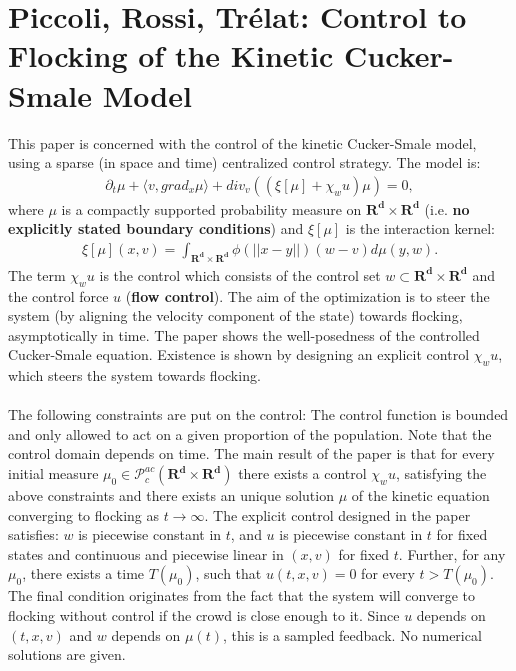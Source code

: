 \documentclass[11pt, a4paper]{article}
\theoremstyle{definition}
\begin{document}
\section{Piccoli, Rossi, Tr\'elat: Control to Flocking of the Kinetic Cucker-Smale Model \cite{piccoli2014no1}}
This paper is concerned with the control of the kinetic Cucker-Smale model, using a sparse (in space and time) centralized control strategy. The model is:
\begin{align*}
\partial_t \mu + \langle v, grad_x \mu\rangle + div_v ((\xi[\mu]+ \chi_w u)\mu)=0,
\end{align*}
where $\mu$ is a compactly supported probability measure on $\mathbf{R^d} \times \mathbf{R^d}$ (i.e. \textbf{no explicitly stated boundary conditions}) and $\xi[\mu]$ is the interaction kernel:
\begin{align*}
\xi[\mu](x,v)= \int_{\mathbf{R^d} \times \mathbf{R^d}} \phi(||x-y||)(w-v) d \mu (y,w).
\end{align*}
The term $\chi_w u$ is the control which consists of the control set $w \subset \mathbf{R^d} \times \mathbf{R^d}$ and the control force $u$ (\textbf{flow control}). The aim of the optimization is to steer the system (by aligning the velocity component of the state) towards flocking, asymptotically in time. The paper shows the well-posedness of the controlled Cucker-Smale equation. Existence is shown by designing an explicit control $\chi_w u$, which steers the system towards flocking. 
\\
\\
The following constraints are put on the control: The control function is bounded and only allowed to act on a given proportion of the population. Note that the control domain depends on time. 
The main result of the paper is that for every initial measure $\mu_0 \in \mathcal{P}_c^{ac}(\mathbf{R^d}\times\mathbf{R^d})$ there exists a control $\chi_w u$, satisfying the above constraints and there exists an unique solution $\mu$ of the kinetic equation converging to flocking as $t \to \infty$. 
The explicit control designed in the paper satisfies: $w$ is piecewise constant in $t$, and $u$ is piecewise constant in $t$ for fixed states and continuous and piecewise linear in $(x,v)$ for fixed $t$. Further, for any $\mu_0$, there exists a time $T(\mu_0)$, such that $u(t,x,v)=0$ for every $t>T(\mu_0)$. The final condition originates from the fact that the system will converge to flocking without control if the crowd is close enough to it. Since $u$ depends on $(t,x,v)$ and $w$ depends on $\mu(t)$, this is a sampled feedback.
No numerical solutions are given.
\end{document}
